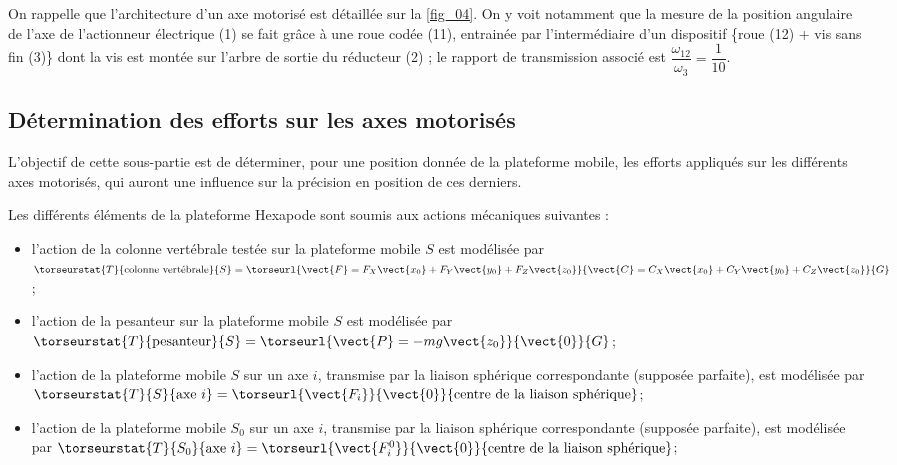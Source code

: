 On rappelle que l’architecture d’un axe motorisé est détaillée sur la \autoref{fig_04}. On y voit notamment que la mesure
de la position angulaire de l’axe de l’actionneur électrique (1) se fait grâce à une roue codée (11), entrainée
par l’intermédiaire d’un dispositif \{roue (12) + vis sans fin (3)\} dont la vis est montée sur l’arbre de sortie du
réducteur (2) ; le rapport de transmission associé est $\dfrac{\omega_{12}}{\omega_{3}}= \dfrac{1}{10}$.


\ifprof
\begin{corrige}
\end{corrige}
\else
\fi

\subsection{Détermination des efforts sur les axes motorisés}
\begin{obj}
L’objectif de cette sous-partie est de déterminer, pour une position donnée de la plateforme mobile, les
efforts appliqués sur les différents axes motorisés, qui auront une influence sur la précision en position
de ces derniers.
\end{obj}


Les différents éléments de la plateforme Hexapode sont soumis aux actions mécaniques suivantes :
\begin{itemize}
\item l’action de la colonne vertébrale testée sur la plateforme mobile $S$ est modélisée par 
$\torseurstat{T}{\text{colonne vertébrale}}{S} = 
\torseurl{\vect{F}=F_X\vect{x_0}+F_Y\vect{y_0}+F_Z\vect{z_0}}
{\vect{C}=C_X\vect{x_0}+C_Y\vect{y_0}+C_Z\vect{z_0}}{G}$;
\item l’action de la pesanteur sur la plateforme mobile $S$ est modélisée par 
$\torseurstat{T}{\text{pesanteur}}{S} = \torseurl{\vect{P}=-mg\vect{z_0}}{\vect{0}}{G}$;
\item l'action de la plateforme mobile $S$ sur un axe $i$, transmise par la liaison sphérique correspondante (supposée parfaite), est modélisée par
$\torseurstat{T}{S}{\text{axe } i} = \torseurl{\vect{F_i}}{\vect{0}}{\text{centre de la liaison sphérique}}$;
\item l'action de la plateforme mobile $S_0$ sur un axe $i$, transmise par la liaison sphérique correspondante (supposée parfaite), est modélisée par
$\torseurstat{T}{S_0}{\text{axe } i} = \torseurl{\vect{F_i^0}}{\vect{0}}{\text{centre de la liaison sphérique}}$;
\end{itemize}

